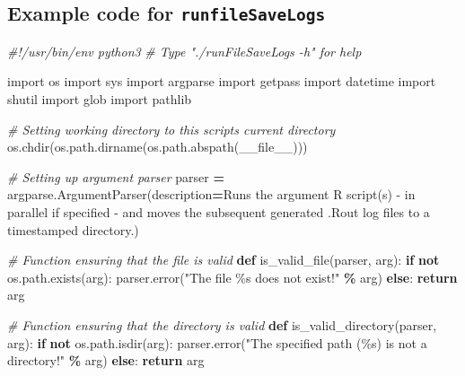 \documentclass[
]{book}
\newenvironment{Shaded}{\begin{snugshade}}{\end{snugshade}}
\newcommand{\CommentTok}[1]{\textcolor[rgb]{0.56,0.35,0.01}{\textit{#1}}}
\newcommand{\ControlFlowTok}[1]{\textcolor[rgb]{0.13,0.29,0.53}{\textbf{#1}}}
\newcommand{\ImportTok}[1]{#1}
\newcommand{\KeywordTok}[1]{\textcolor[rgb]{0.13,0.29,0.53}{\textbf{#1}}}
\newcommand{\NormalTok}[1]{#1}
\newcommand{\OperatorTok}[1]{\textcolor[rgb]{0.81,0.36,0.00}{\textbf{#1}}}
\newcommand{\SpecialCharTok}[1]{\textcolor[rgb]{0.00,0.00,0.00}{#1}}
\newcommand{\StringTok}[1]{\textcolor[rgb]{0.31,0.60,0.02}{#1}}
\newcommand{\VariableTok}[1]{\textcolor[rgb]{0.00,0.00,0.00}{#1}}
\begin{document}
\hypertarget{example-code-for-runfilesavelogs}{%
\subsection{\texorpdfstring{Example code for \texttt{runfileSaveLogs}}{Example code for runfileSaveLogs}}\label{example-code-for-runfilesavelogs}}

\begin{Shaded}
\begin{Highlighting}[]
\CommentTok{\#!/usr/bin/env python3}
\CommentTok{\# Type "./runFileSaveLogs {-}h" for help}

\ImportTok{import}\NormalTok{ os}
\ImportTok{import}\NormalTok{ sys}
\ImportTok{import}\NormalTok{ argparse}
\ImportTok{import}\NormalTok{ getpass}
\ImportTok{import}\NormalTok{ datetime}
\ImportTok{import}\NormalTok{ shutil}
\ImportTok{import}\NormalTok{ glob}
\ImportTok{import}\NormalTok{ pathlib}

\CommentTok{\# Setting working directory to this script\textquotesingle{}s current directory}
\NormalTok{os.chdir(os.path.dirname(os.path.abspath(}\VariableTok{\_\_file\_\_}\NormalTok{)))}

\CommentTok{\# Setting up argument parser}
\NormalTok{parser }\OperatorTok{=}\NormalTok{ argparse.ArgumentParser(description}\OperatorTok{=}\StringTok{\textquotesingle{}Runs the argument R script(s) {-} in parallel if specified {-} and moves the subsequent generated .Rout log files to a timestamped directory.\textquotesingle{}}\NormalTok{)}

\CommentTok{\# Function ensuring that the file is valid}
\KeywordTok{def}\NormalTok{ is\_valid\_file(parser, arg):}
    \ControlFlowTok{if} \KeywordTok{not}\NormalTok{ os.path.exists(arg):}
\NormalTok{        parser.error(}\StringTok{"The file }\SpecialCharTok{\%s}\StringTok{ does not exist!"} \OperatorTok{\%}\NormalTok{ arg)}
    \ControlFlowTok{else}\NormalTok{:}
        \ControlFlowTok{return}\NormalTok{ arg}

\CommentTok{\# Function ensuring that the directory is valid}
\KeywordTok{def}\NormalTok{ is\_valid\_directory(parser, arg):}
    \ControlFlowTok{if} \KeywordTok{not}\NormalTok{ os.path.isdir(arg):}
\NormalTok{        parser.error(}\StringTok{"The specified path (}\SpecialCharTok{\%s}\StringTok{) is not a directory!"} \OperatorTok{\%}\NormalTok{ arg)}
    \ControlFlowTok{else}\NormalTok{:}
        \ControlFlowTok{return}\NormalTok{ arg}


\end{Highlighting}
\end{Shaded}
\end{document}
